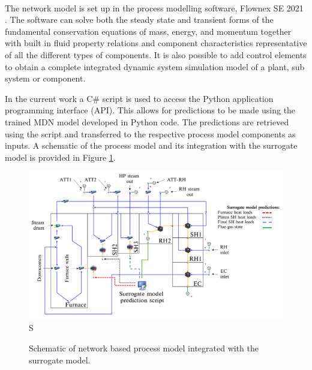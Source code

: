 \documentclass[a4paper,fleqn]{cas-sc}
\begin{document}
The network model is set up in the process modelling software, Flownex SE\textsuperscript{\textregistered} 2021 \cite{flownex}.  The software can solve both the steady state and transient forms of the fundamental conservation equations of mass, energy, and momentum together with built in fluid property relations and component characteristics representative of all the different types of components.  It is also possible to add control elements to obtain a complete integrated dynamic system simulation model of a plant, sub system or component. 

In the current work a C\# script is used to access the Python application programming interface (API). This allows for predictions to be made using the trained MDN model developed in Python code. The predictions are retrieved using the script and transferred to the respective process model components as inputs. A schematic of the process model and its integration with the surrogate model is provided in Figure \ref{fig_int_model}.\\
\begin{figure}[h!]
	\centering
		\includegraphics[scale=0.15]{INTEGRATED_MODEL}S
	  \caption{Schematic of network based process model integrated with the surrogate model.}\label{fig_int_model}
\end{figure}
\end{document}
